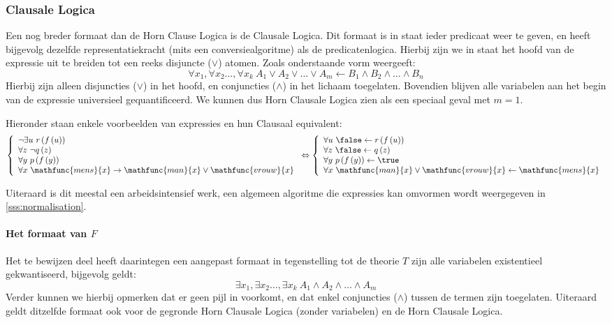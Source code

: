 \subsubsection{Clausale Logica}
\label{sss:clausaleLogic}
Een nog breder formaat dan de Horn Clause Logica is de Clausale Logica. Dit formaat is in staat ieder predicaat weer te geven, en heeft bijgevolg dezelfde representatiekracht (mits een conversiealgoritme) als de predicatenlogica. Hierbij zijn we in staat het hoofd van de expressie uit te breiden tot een reeks disjuncte ($\vee$) atomen. Zoals onderstaande vorm weergeeft:
\begin{equation}
\forall x_1,\forall x_2\ldots,\forall x_k\ A_1\vee A_2\vee\ldots\vee A_m\leftarrow B_1\wedge B_2\wedge\ldots\wedge B_n
\end{equation}
Hierbij zijn alleen disjuncties ($\vee$) in het hoofd, en conjuncties ($\wedge$) in het lichaam toegelaten. Bovendien blijven alle variabelen aan het begin van de expressie universieel gequantificeerd. We kunnen dus Horn Clausale Logica zien als een speciaal geval met $m=1$.
\begin{leftbar}
Hieronder staan enkele voorbeelden van expressies en hun Clausaal equivalent:
\begin{equation}
\left\{\begin{array}{l}
\neg\exists u\ r\left(f\left(u\right)\right)\\
\forall z\ \neg q\left(z\right)\\
\forall y\ p\left(f\left(y\right)\right)\\
\forall x\ \mathfunc{mens}{x}\rightarrow\mathfunc{man}{x}\vee\mathfunc{vrouw}{x}
\end{array}\right.\Leftrightarrow\left\{\begin{array}{l}
\forall u\ \false\leftarrow r\left(f\left(u\right)\right)\\
\forall z\ \false\leftarrow q\left(z\right)\\
\forall y\ p\left(f\left(y\right)\right)\leftarrow\true\\
\forall x\ \mathfunc{man}{x}\vee\mathfunc{vrouw}{x}\leftarrow\mathfunc{mens}{x}
\end{array}\right.
\end{equation}
\end{leftbar}
Uiteraard is dit meestal een arbeidsintensief werk, een algemeen algoritme die expressies kan omvormen wordt weergegeven in \ref{sss:normalisation}.
\paragraph{Het formaat van $F$}
Het te bewijzen deel heeft daarintegen een aangepast formaat in tegenstelling tot de theorie $T$ zijn alle variabelen existentieel gekwantiseerd, bijgevolg geldt:
\begin{equation}
\exists x_1,\exists x_2\ldots,\exists x_k\ A_1\wedge A_2\wedge\ldots\wedge A_m
\end{equation}
Verder kunnen we hierbij opmerken dat er geen pijl in voorkomt, en dat enkel conjuncties ($\wedge$) tussen de termen zijn toegelaten. Uiteraard geldt ditzelfde formaat ook voor de gegronde Horn Clausale Logica (zonder variabelen) en de Horn Clausale Logica.
